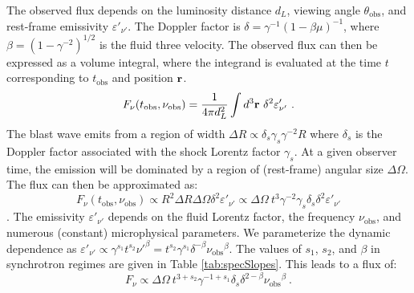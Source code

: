 \documentclass[twocolumn]{aastex62}
\newcommand{\tobs}{\ensuremath{t_{\mathrm{obs}}}}
\newcommand{\nuobs}{\ensuremath{\nu_{\mathrm{obs}}}}
\newcommand{\thobs}{\ensuremath{\theta_{\mathrm{obs}}}}
\begin{document}
The observed flux depends on the luminosity distance $d_L$, viewing angle $\thobs$, and rest-frame emissivity $\varepsilon'_{\nu'}$.  The Doppler factor is $\delta = \gamma^{-1} (1-\beta\mu)^{-1}$, where $\beta=(1-\gamma^{-2})^{1/2}$ is the fluid three velocity.  The observed flux can then be expressed as a volume integral, where the integrand is evaluated at the time $t$ corresponding to $\tobs$ and position ${\bf r}$.
\begin{equation}
	F_\nu(\tobs, \nuobs) = \frac{1}{4\pi d_L^2} \int d^3{\bf r} \ \delta^2 \varepsilon'_{\nu'}\ .
\end{equation}  
The blast wave emits from a region of width $\Delta R \propto \delta_s \gamma_s \gamma^{-2} R $ where $\delta_s$ is the Doppler factor associated with the shock Lorentz factor $\gamma_s$. At a given observer time, the emission will be dominated by a region of (rest-frame) angular size $\Delta \Omega$.  The flux can then be approximated as:
\begin{equation}
	F_\nu(\tobs, \nuobs) \propto R^2 \Delta R \Delta \Omega \delta^2 \varepsilon'_{\nu'} \propto \Delta \Omega\ t^3 \gamma^{-2} \gamma_s \delta_s \delta^2 \varepsilon'_{\nu'}
\end{equation}.
The emissivity $\varepsilon'_{\nu'}$ depends on the fluid Lorentz factor, the frequency $\nuobs$, and numerous (constant) microphysical parameters.  We parameterize the dynamic dependence as $\varepsilon'_{\nu'} \propto \gamma^{s_1} t^{s_2} {\nu'}^\beta = t^{s_2} \gamma^{s_1}\delta^{-\beta} \nuobs^\beta$. The values of $s_1$, $s_2$, and $\beta$ in synchrotron regimes are given in Table \ref{tab:specSlopes}.  This leads to a flux of:
\begin{equation}
	F_\nu \propto \Delta \Omega\ t^{3+s_2} \gamma^{-1+s_1} \delta_s \delta^{2-\beta} \nuobs^\beta\ . \label{eq:fluxApprox}
\end{equation}
\end{document}
